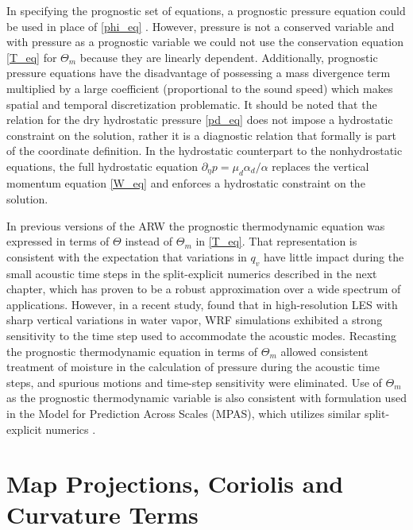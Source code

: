 In specifying the prognostic set of equations, a prognostic pressure equation could be used in
place of \eqref{phi_eq} \citep[see][]{laprise92}. However, pressure is
not a conserved variable and with pressure as a prognostic variable we could not use the conservation equation \eqref{T_eq} for $\Theta_m$  because
they are linearly dependent.  
Additionally, prognostic pressure
equations have the disadvantage of possessing a mass divergence term
multiplied by a large coefficient (proportional to the sound speed)
which makes spatial and temporal discretization problematic.
It should be noted that the relation for the dry hydrostatic pressure
\eqref{pd_eq} does not impose a hydrostatic constraint on
the solution, rather it is a diagnostic relation that formally is part
of the coordinate definition.  In the hydrostatic counterpart to the
nonhydrostatic equations, the full hydrostatic equation $\partial_\eta p=\mu_d\alpha_d/\alpha$ replaces the
vertical momentum equation \eqref{W_eq} and enforces a hydrostatic 
constraint on the solution.

In previous versions of the ARW the prognostic thermodynamic equation was expressed in terms of $\Theta$ instead of $\Theta_m$ in \eqref{T_eq}. That representation is consistent with the expectation that variations in $q_v$ have little impact during the small acoustic time steps in the split-explicit numerics described in the next chapter, which has proven to be a robust approximation over a wide spectrum of applications. However, in a recent study, \citet{xiao15} found that in high-resolution LES with sharp vertical variations in water vapor, WRF simulations exhibited a strong sensitivity to the time step used to accommodate the acoustic modes. Recasting the prognostic thermodynamic equation in terms of $\Theta_m$ allowed consistent treatment of moisture in the calculation of pressure during the acoustic time steps, and spurious motions and time-step sensitivity were eliminated. Use of $\Theta_m$ as the prognostic thermodynamic variable is also consistent with formulation used in the Model for Prediction Across Scales (MPAS), which utilizes similar split-explicit numerics \citep{skamarock12}.


\section{Map Projections, Coriolis and Curvature Terms}
\label{spherical_projections}

